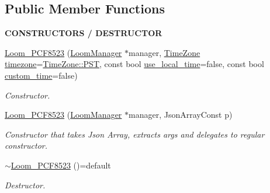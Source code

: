 \subsection*{Public Member Functions}
\begin{Indent}{\bf C\+O\+N\+S\+T\+R\+U\+C\+T\+O\+RS / D\+E\+S\+T\+R\+U\+C\+T\+OR}\par
\begin{DoxyCompactItemize}
\item 
\hyperlink{class_loom___p_c_f8523_ae2bae04c42dcf3fdacd611a3cd710049}{Loom\+\_\+\+P\+C\+F8523} (\hyperlink{class_loom_manager}{Loom\+Manager} $\ast$manager, \hyperlink{class_loom_r_t_c_a103a9db94b031555185bbce688d2527a}{Time\+Zone} \hyperlink{class_loom_r_t_c_a6c1336bf000fd9a385f315d43bbbc5b0}{timezone}=\hyperlink{class_loom_r_t_c_a103a9db94b031555185bbce688d2527aa67d47df7eb52f9e54f467763167398f3}{Time\+Zone\+::\+P\+ST}, const bool \hyperlink{class_loom_r_t_c_a5783620e9af8eb5fa0818aa189483d8e}{use\+\_\+local\+\_\+time}=false, const bool \hyperlink{class_loom_r_t_c_a91c96be6cc3f0f0f4dedbb038f164e73}{custom\+\_\+time}=false)
\begin{DoxyCompactList}\small\item\em Constructor. \end{DoxyCompactList}\item 
\hyperlink{class_loom___p_c_f8523_aecc9bb1632c201d1c7ed2ef7c1c6cb1b}{Loom\+\_\+\+P\+C\+F8523} (\hyperlink{class_loom_manager}{Loom\+Manager} $\ast$manager, Json\+Array\+Const p)
\begin{DoxyCompactList}\small\item\em Constructor that takes Json Array, extracts args and delegates to regular constructor. \end{DoxyCompactList}\item 
\hyperlink{class_loom___p_c_f8523_a3604a6574b45d50a00f6443cbd7a8018}{$\sim$\+Loom\+\_\+\+P\+C\+F8523} ()=default
\begin{DoxyCompactList}\small\item\em Destructor. \end{DoxyCompactList}\end{DoxyCompactItemize}
\end{Indent}
